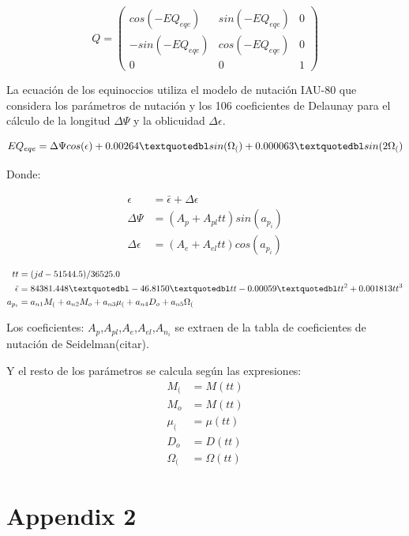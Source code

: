  \[ Q =
\left( \begin{array}{ccc}
 cos(-EQ_{eqe}) & sin(-EQ_{eqe}) &  0 \\ 
 -sin(-EQ_{eqe}) & cos(-EQ_{eqe}) &  0 \\
 0 & 0 & 1
\end{array} \right) \] 


La ecuaci\'on de los equinoccios utiliza el modelo de nutaci\'on IAU-80 que considera los par\'ametros de nutaci\'on y los 106 coeficientes de Delaunay para el c\'alculo de la longitud $\Delta \Psi$ y la oblicuidad $\Delta \epsilon$.

\begin{equation}
 EQ_{eqe}=\Delta \Psi cos({\epsilon}) + 0.00264 \textquotedbl sin(\Omega_{(}) + 0.000063 \textquotedbl sin (2 \Omega_{(})
\end{equation}

Donde:

\begin{align*}
 \epsilon &= {\bar{\epsilon}} + \Delta \epsilon\\
 \Delta \Psi &= (A_{p} + A_{pl} tt) sin(a_{p_{i}})\\
 \Delta \epsilon &= (A_{e} + A_{el} tt) cos(a_{p_{i}})
\end{align*}

\begin{align*}
 tt &= (jd - 51544.5)/36525.0\\
 {\bar{\epsilon}} &= 84381.448 \textquotedbl - 46.8150 \textquotedbl tt - 0.00059 \textquotedbl tt^{2} + 0.001813 tt^{3}\\
 a_{p_{i}} &= a_{n1}M_{(}+a_{n2}M_{o}+a_{n3}\mu_{(}+a_{n4}D_{o}+a_{n5}\Omega_{(}
\end{align*}

Los coeficientes: $A_{p}$,$A_{pl}$,$A_{e}$,$A_{el}$,$A_{n_{i}}$ se extraen de la tabla de coeficientes de nutaci\'on de Seidelman(citar).

Y el resto de los par\'ametros se calcula seg\'un las expresiones:\\

\begin{align*}
 M_{(} & = M(tt)\\
 M_{o} & = M(tt)\\
 \mu_{(} &= \mu(tt)\\
 D_{o} &= D(tt)\\
 \Omega_{(} &= \Omega(tt)
\end{align*}

\section{Appendix 2}
\label{App2}
